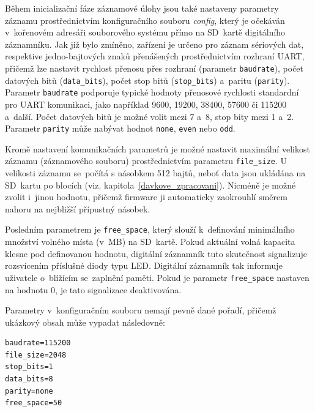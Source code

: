 
Během inicializační fáze záznamové úlohy jsou také nastaveny parametry záznamu prostřednictvím konfiguračního souboru \textit{config}, který je očekáván v~kořenovém adresáři souborového systému přímo na SD~kartě digitálního záznamníku. Jak již bylo zmíněno, zařízení je určeno pro záznam sériových dat, respektive jedno-bajtových znaků přenášených prostřednictvím rozhraní UART, přičemž lze nastavit rychlost přenosu přes rozhraní (parametr \texttt{baudrate}), počet datových bitů (\texttt{data\_bits}), počet stop bitů (\texttt{stop\_bits}) a~paritu (\texttt{parity}). Parametr \texttt{baudrate} podporuje typické hodnoty přenosové rychlosti standardní pro UART komunikaci, jako například 9600, 19200, 38400, 57600 či 115200 a~další. Počet datových bitů je možné volit mezi 7 a~8, stop bity mezi 1 a~2. Parametr \texttt{parity} může nabývat hodnot \texttt{none}, \texttt{even} nebo \texttt{odd}.

Kromě nastavení komunikačních parametrů je možné nastavit maximální velikost záznamu (záznamového souboru) prostřednictvím parametru \texttt{file\_size}. U velikosti záznamu se~počítá s násobkem 512 bajtů, neboť data jsou ukládána na SD~kartu po blocích (viz. kapitola~\ref{davkove_zpracovani}). Nicméně je možné zvolit i~jinou hodnotu, přičemž firmware ji automaticky zaokrouhlí směrem nahoru na nejbližší přípustný násobek. 

Posledním parametrem je \texttt{free\_space}, který slouží k~definování minimálního množství volného místa (v~MB) na SD~kartě. Pokud aktuální volná kapacita klesne pod definovanou hodnotu, digitální záznamník tuto skutečnost signalizuje rozsvícením příslušné diody typu LED. Digitální záznamník tak informuje uživatele o~blížícím se~zaplnění paměti. Pokud je parametr \texttt{free\_space} nastaven na hodnotu 0, je tato signalizace deaktivována.

Parametry v~konfiguračním souboru nemají pevně dané pořadí, přičemž ukázkový obsah může vypadat následovně:

\begin{verbatim}
baudrate=115200
file_size=2048
stop_bits=1
data_bits=8
parity=none
free_space=50
\end{verbatim}

